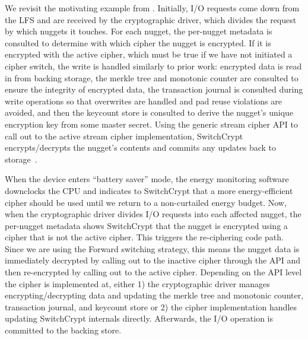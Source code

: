 We revisit the motivating example from . Initially, I/O
requests come down from the LFS and are received by the cryptographic driver,
which divides the request by which nuggets it touches. For each nugget, the
per-nugget metadata is consulted to determine with which cipher the nugget is
encrypted. If it is encrypted with the active cipher, which must be true if we
have not initiated a cipher switch, the write is handled similarly to prior
work: encrypted data is read in from backing storage, the merkle tree and
monotonic counter are consulted to ensure the integrity of encrypted data, the
transaction journal is consulted during write operations so that overwrites are
handled and pad reuse violations are avoided, and then the keycount store is
consulted to derive the nugget's unique encryption key from some master secret.
Using the generic stream cipher API to call out to the active stream cipher
implementation, SwitchCrypt encrypts/decrypts the nugget's contents and commits
any updates back to storage~\cite{StrongBox}.

When the device enters ``battery saver'' mode, the energy monitoring software
downclocks the CPU and indicates to SwitchCrypt that a more energy-efficient
cipher should be used until we return to a non-curtailed energy budget. Now,
when the cryptographic driver divides I/O requests into each affected nugget,
the per-nugget metadata shows SwitchCrypt that the nugget is encrypted using a
cipher that is not the active cipher. This triggers the re-ciphering code path.
Since we are using the Forward switching strategy, this means the nugget data is
immediately decrypted by calling out to the inactive cipher through the API and
then re-encrypted by calling out to the active cipher. Depending on the API
level the cipher is implemented at, either 1) the cryptographic driver manages
encrypting/decrypting data and updating the merkle tree and monotonic counter,
transaction journal, and keycount store or 2) the cipher implementation handles
updating SwitchCrypt internals directly. Afterwards, the I/O operation is
committed to the backing store.
